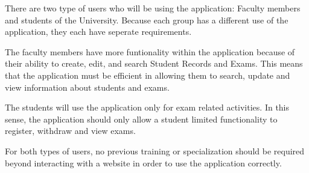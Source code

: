 
There are two type of users who will be using the application: Faculty members
and students of the University. Because each group has a different use of the
application, they each have seperate requirements.

The faculty members have more funtionality within the application because of
their ability to create, edit, and search Student Records and Exams. This means
that the application must be efficient in allowing them to search, update and
view information about students and exams.

The students will use the application only for exam related activities. In this
sense, the application should only allow a student limited functionality to
register, withdraw and view exams.

For both types of users, no previous training or specialization should be
required beyond interacting with a website in order to use the application
correctly.
